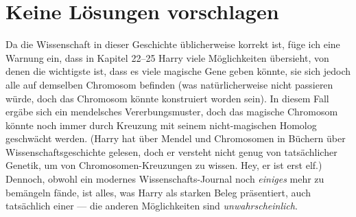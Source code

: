 \chapter{Keine Lösungen vorschlagen}

\begin{chapterOpeningAuthorNote}
Da die Wissenschaft in dieser Geschichte üblicherweise korrekt ist, füge ich eine Warnung ein, dass in Kapitel 22–25 Harry viele Möglichkeiten übersieht, von denen die wichtigste ist, dass es viele magische Gene geben könnte, sie sich jedoch alle auf demselben Chromosom befinden (was natürlicherweise nicht passieren würde, doch das Chromosom könnte konstruiert worden sein). In diesem Fall ergäbe sich ein mendelsches Vererbungsmuster, doch das magische Chromosom könnte noch immer durch Kreuzung mit seinem nicht-magischen Homolog geschwächt werden. (Harry hat über Mendel und Chromosomen in Büchern über Wissenschaftsgeschichte gelesen, doch er versteht nicht genug von tatsächlicher Genetik, um von Chromosomen-Kreuzungen zu wissen. Hey, er ist erst elf.) Dennoch, obwohl ein modernes Wissenschafts-Journal noch \emph{einiges} mehr zu bemängeln fände, ist alles, was Harry als starken Beleg präsentiert, auch tatsächlich einer — die anderen Möglichkeiten sind \emph{unwahrscheinlich}.%
\end{chapterOpeningAuthorNote}

